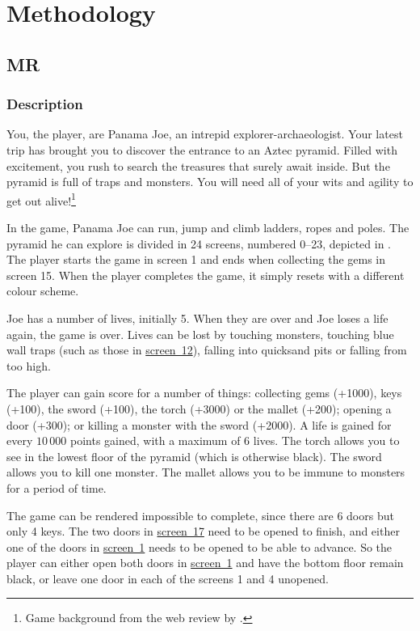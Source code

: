 \newcommand{\refscreen}[1]{\hyperref[fig:montezuma-map]{screen~#1}}
\chapter{Methodology}
\section{\acl{MR}}
\subsection{Description\label{subsec:mr-description}}
You, the player, are Panama Joe, an intrepid explorer-archaeologist. Your latest
trip has brought you to discover the entrance to an Aztec pyramid. Filled with
excitement, you rush to search the treasures that surely await inside. But the
pyramid is full of traps and monsters. You will need all of your wits and agility to
get out alive!\footnote{Game background from the web review by \citet{adair2007montezuma}.}

In the game, Panama Joe can run, jump and climb ladders, ropes and poles. The
pyramid he can explore is divided in 24 screens, numbered 0--23, depicted in
. The player starts the game in screen 1 and ends when
collecting the gems in screen 15. When the player completes the game, it simply
resets with a different colour scheme.

Joe has a number of lives, initially 5. When they are over and Joe loses a life
again, the game is over. Lives can be lost by touching monsters, touching blue
wall traps (such as those in \refscreen{12}), falling
into quicksand pits or falling from too high.

The player can gain score for a number of things: collecting gems (+1000),
keys (+100), the sword (+100), the torch (+3000) or the mallet (+200); opening a
door (+300); or killing a monster with the sword (+2000). A life
is gained for every $10\,000$ points gained, with a maximum of 6 lives. The
torch allows you to see in the lowest floor of the pyramid (which is otherwise
black). The sword allows you to kill one monster. The mallet allows you to be
immune to monsters for a period of time.

The game can be rendered impossible to complete, since there are 6 doors but
only 4 keys. The two doors in \refscreen{17} need to be opened to finish, and
either one of the doors in \refscreen{1} needs to be opened to be able to
advance. So the player can either open both doors in \refscreen{1} and have
the bottom floor remain black, or leave one door in each of the screens 1 and 4
unopened.

